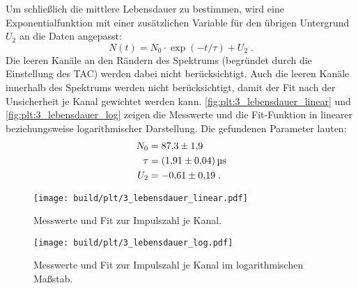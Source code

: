 Um schließlich die mittlere Lebensdauer zu bestimmen,
wird eine Exponentialfunktion mit einer zusätzlichen Variable für den übrigen Untergrund $U_2$ an die Daten angepasst:
\begin{equation*}
    N(t) = N_0 \cdot \exp (-t / \tau) + U_2 \; .
\end{equation*}
Die leeren Kanäle an den Rändern des Spektrums (begründet durch die Einstellung des \ac{TAC}) werden dabei nicht berücksichtigt.
Auch die leeren Kanäle innerhalb des Spektrums werden nicht berücksichtigt,
damit der Fit nach der Unsicherheit je Kanal gewichtet werden kann.
\autoref{fig:plt:3_lebensdauer_linear} und \autoref{fig:plt:3_lebensdauer_log} zeigen die Messwerte und die Fit-Funktion
in linearer beziehungsweise logarithmischer Darstellung.
Die gefundenen Parameter lauten:
\begin{align*}
    N_0 &= \num{87.3 \pm 1.9} \\
    \tau &= \SI{1.91 \pm 0.04}{\micro\second} \\
    U_2 &= \num{-0.61 \pm 0.19} \; .
\end{align*}

\begin{figure}
    \centering
    \texttt{[image: build/plt/3\_lebensdauer\_linear.pdf]}
    \caption{Messwerte und Fit zur Impulszahl je Kanal.}
    \label{fig:plt:3_lebensdauer_linear}
\end{figure}

\begin{figure}
    \centering
    \texttt{[image: build/plt/3\_lebensdauer\_log.pdf]}
    \caption{Messwerte und Fit zur Impulszahl je Kanal im logarithmischen Maßstab.}
    \label{fig:plt:3_lebensdauer_log}
\end{figure}
